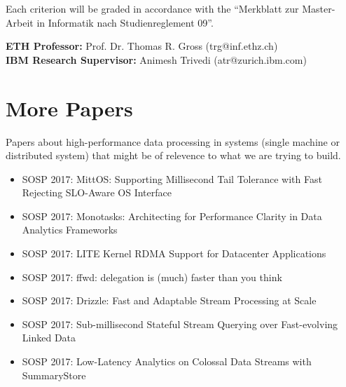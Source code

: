 \documentclass[10pt,a4paper]{article}
\begin{document}
Each criterion will be graded in accordance with the
``Merkblatt zur Master-Arbeit in Informatik nach Studienreglement 09''.


\textbf{ETH Professor:} Prof. Dr. Thomas R. Gross (trg@inf.ethz.ch)\\
\textbf{IBM Research Supervisor:} Animesh Trivedi (atr@zurich.ibm.com)\\

\section*{More Papers}
Papers about high-performance data processing in systems (single machine or 
distributed system) that might be of relevence to what we are trying to build. 
\begin{itemize}
  \item SOSP 2017: MittOS: Supporting Millisecond Tail Tolerance with Fast Rejecting SLO-Aware OS Interface
  \item SOSP 2017: Monotasks: Architecting for Performance Clarity in Data Analytics Frameworks
  \item SOSP 2017: LITE Kernel RDMA Support for Datacenter Applications
  \item SOSP 2017: ffwd: delegation is (much) faster than you think
  \item SOSP 2017: Drizzle: Fast and Adaptable Stream Processing at Scale
  \item SOSP 2017: Sub-millisecond Stateful Stream Querying over Fast-evolving Linked Data
  \item SOSP 2017: Low-Latency Analytics on Colossal Data Streams with SummaryStore  
\end{itemize}
\raggedright


\end{document}
